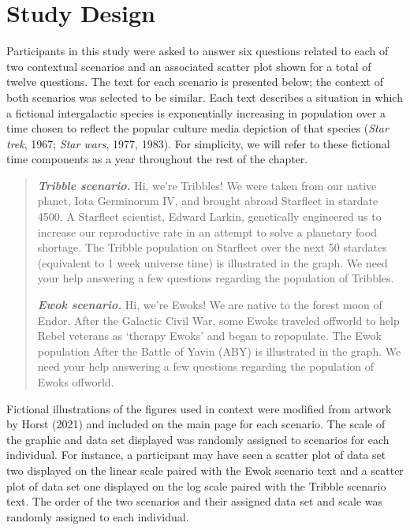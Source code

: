 \documentclass[print]{nuthesis}
\begin{document}
\hypertarget{study-design-2}{%
\section{Study Design}\label{study-design-2}}

Participants in this study were asked to answer six questions related to each of two contextual scenarios and an associated scatter plot shown for a total of twelve questions.
The text for each scenario is presented below; the context of both scenarios was selected to be similar.
Each text describes a situation in which a fictional intergalactic species is exponentially increasing in population over a time chosen to reflect the popular culture media depiction of that species (\emph{Star trek}, 1967; \emph{Star wars}, 1977, 1983).
For simplicity, we will refer to these fictional time components as a year throughout the rest of the chapter.

\begin{quote}
\textbf{\textit{Tribble scenario.}} Hi, we're Tribbles! We were taken from our native planet, Iota Germinorum IV, and brought abroad Starfleet in stardate 4500. A Starfleet scientist, Edward Larkin, genetically engineered us to increase our reproductive rate in an attempt to solve a planetary food shortage. The Tribble population on Starfleet over the next 50 stardates (equivalent to 1 week universe time) is illustrated in the graph. We need your help answering a few questions regarding the population of Tribbles.

\textbf{\textit{Ewok scenario.}} Hi, we're Ewoks! We are native to the forest moon of Endor. After the Galactic Civil War, some Ewoks traveled offworld to help Rebel veterans as `therapy Ewoks' and began to repopulate. The Ewok population After the Battle of Yavin (ABY) is illustrated in the graph. We need your help answering a few questions regarding the population of Ewoks offworld.
\end{quote}

Fictional illustrations of the figures used in context were modified from artwork by Horst (2021) and included on the main page for each scenario.
The scale of the graphic and data set displayed was randomly assigned to scenarios for each individual.
For instance, a participant may have seen a scatter plot of data set two displayed on the linear scale paired with the Ewok scenario text and a scatter plot of data set one displayed on the log scale paired with the Tribble scenario text.
The order of the two scenarios and their assigned data set and scale was randomly assigned to each individual.
\end{document}

